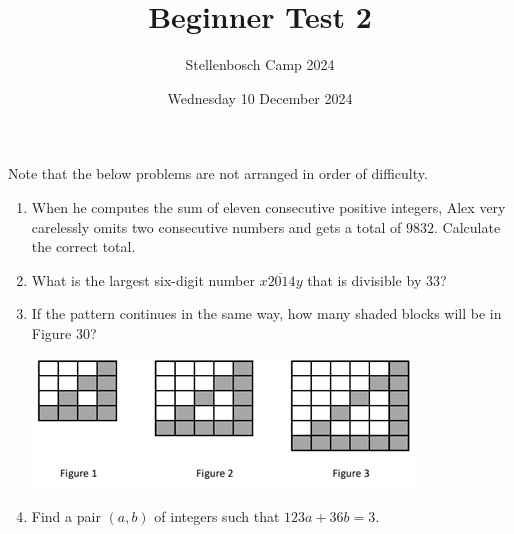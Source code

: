 \documentclass[12pt]{article}
\title{Beginner Test 2}
\author{Stellenbosch Camp 2024}
\date{Wednesday 10 December 2024}
\begin{document}
 \maketitle

Note that the below problems are not arranged in order of difficulty.

\begin{enumerate}[topsep=2\bigskipamount,itemsep=1.4\bigskipamount]


\item When he computes the sum of eleven consecutive positive integers, Alex very carelessly omits two consecutive numbers and gets a total of $9832$.
Calculate the correct total.

\item What is the largest six-digit number $\overline{x2014y}$ that is divisible by $33$?




\item If the pattern continues in the same way, how many shaded blocks will be in Figure $30$?
\begin{center}
    \includegraphics[scale=0.7]{fig1.png}
\end{center}

\item Find a pair $(a,b)$ of integers such that $123a +36b =3$.


\end{enumerate}
\end{document}
